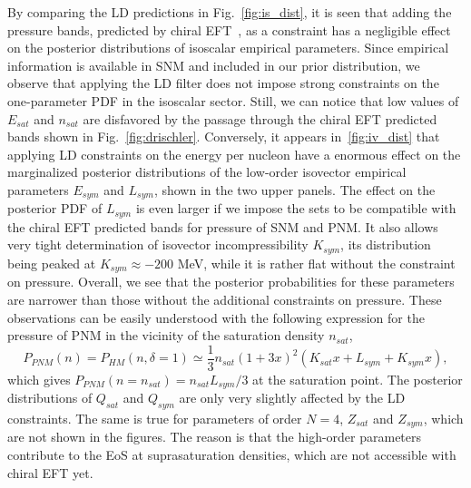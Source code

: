 By comparing the LD predictions in Fig.~\ref{fig:is_dist}, it is seen that 
adding the pressure bands, predicted by chiral EFT~\cite{Drischler2016}, as a 
constraint has a negligible effect on the posterior distributions of isoscalar
empirical parameters. Since empirical information is available in SNM and
included in our prior distribution, we observe that applying the LD filter 
does not impose strong constraints on the one-parameter PDF in the isoscalar 
sector. Still, we can notice that low values of $E_{sat}$ and $n_{sat}$ are 
disfavored by the passage through the chiral EFT predicted bands shown in 
Fig.~\ref{fig:drischler}. Conversely, it appears in~\ref{fig:iv_dist} that
applying LD constraints on the energy per nucleon have a enormous effect on the 
marginalized posterior distributions of the low-order isovector empirical 
parameters $E_{sym}$ and $L_{sym}$, shown in the two upper panels. The effect
on the posterior PDF of $L_{sym}$ is even larger if we impose the sets to be
compatible with the chiral EFT predicted bands for pressure of SNM and PNM. It 
also allows very tight determination of isovector incompressibility $K_{sym}$,
its distribution being peaked at $K_{sym} \approx -200$ MeV, while it is rather
flat without the constraint on pressure. Overall, 
we see that the posterior probabilities for these parameters are narrower
than those without the additional constraints on pressure. These observations 
can be easily understood with the following expression for the pressure 
of PNM in the vicinity of the saturation density $n_{sat}$,
%
\begin{equation}
  P_{PNM}(n) = P_{HM}(n,\delta=1) \simeq \frac{1}{3}n_{sat}(1+3x)^2(K_{sat}x +
    L_{sym} + K_{sym}x),
\end{equation}
%
which gives $P_{PNM}(n=n_{sat}) = n_{sat}L_{sym}/3$ at the saturation point. 
The posterior distributions of $Q_{sat}$ and $Q_{sym}$ are only very slightly  
affected by the LD constraints. The same is true for parameters of order $N=4$, 
$Z_{sat}$ and $Z_{sym}$, which are not shown in the figures. The reason is that
the high-order parameters contribute to the EoS at suprasaturation densities,
which are not accessible with chiral EFT yet.

